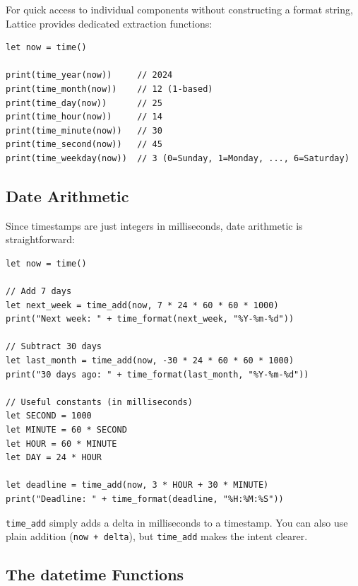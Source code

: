 
For quick access to individual components without constructing a format
string, Lattice provides dedicated extraction functions:

\begin{lstlisting}[language=Lattice, caption={Extracting date and time components}]
let now = time()

print(time_year(now))     // 2024
print(time_month(now))    // 12 (1-based)
print(time_day(now))      // 25
print(time_hour(now))     // 14
print(time_minute(now))   // 30
print(time_second(now))   // 45
print(time_weekday(now))  // 3 (0=Sunday, 1=Monday, ..., 6=Saturday)
\end{lstlisting}

\subsection{Date Arithmetic}\label{sec:date-arithmetic}


Since timestamps are just integers in milliseconds, date arithmetic is
straightforward:

\begin{lstlisting}[language=Lattice, caption={Date arithmetic with timestamps}]
let now = time()

// Add 7 days
let next_week = time_add(now, 7 * 24 * 60 * 60 * 1000)
print("Next week: " + time_format(next_week, "%Y-%m-%d"))

// Subtract 30 days
let last_month = time_add(now, -30 * 24 * 60 * 60 * 1000)
print("30 days ago: " + time_format(last_month, "%Y-%m-%d"))

// Useful constants (in milliseconds)
let SECOND = 1000
let MINUTE = 60 * SECOND
let HOUR = 60 * MINUTE
let DAY = 24 * HOUR

let deadline = time_add(now, 3 * HOUR + 30 * MINUTE)
print("Deadline: " + time_format(deadline, "%H:%M:%S"))
\end{lstlisting}

\lstinline|time_add| simply adds a delta in milliseconds to a timestamp.
You can also use plain addition (\lstinline|now + delta|), but
\lstinline|time_add| makes the intent clearer.

\subsection{The datetime Functions}\label{sec:datetime}

